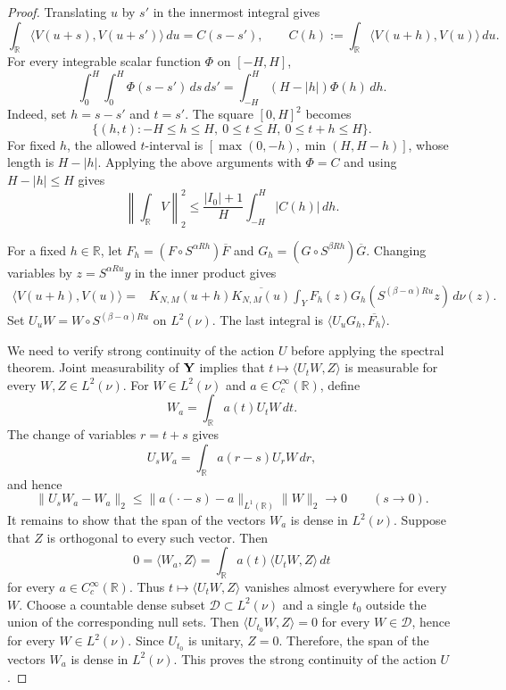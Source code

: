 \documentclass[reqno,12pt]{amsart}
\def \R {\mathbb R}
\numberwithin{equation}{section}
\begin{document}
\begin{proof}
Translating $u$ by $s'$ in the innermost integral gives
\[
 \int_\R\langle V(u+s),V(u+s')\rangle\,du=C(s-s'),
 \qquad
 C(h):=\int_\R\langle V(u+h),V(u)\rangle\,du.
\]
For every integrable scalar function $\Phi$ on $[-H,H]$,
\[
 \int_0^H\int_0^H\Phi(s-s')\,ds\,ds'
 =\int_{-H}^H(H-|h|)\Phi(h)\,dh.
\]
Indeed, set $h=s-s'$ and $t=s'$. The square $[0,H]^2$ becomes
\[
 \{(h,t):-H\le h\le H,\ 0\le t\le H,\ 0\le t+h\le H\}.
\]
For fixed $h$, the allowed $t$-interval is
$[\max(0,-h),\min(H,H-h)]$, whose length is $H-|h|$. Applying the above arguments with $\Phi=C$ and using $H-|h|\le H$ gives
\[
 \left\|\int_\R V\right\|_2^2
 \le\frac{|I_0|+1}{H}\int_{-H}^H|C(h)|\,dh.
\]

For a fixed $h\in\R$, let
$F_h=(F\circ S^{\alpha Rh})\overline F$ and
$G_h=(G\circ S^{\beta Rh})\overline G$.
Changing variables by $z=S^{\alpha Ru}y$ in the inner product gives
\begin{align*}
 \langle V(u+h),V(u)\rangle
 ={}&K_{N,M}(u+h)\overline{K_{N,M}(u)}
 \int_Y F_h(z)G_h(S^{(\beta-\alpha)Ru}z)\,d\nu(z).
\end{align*}
Set $U_uW=W\circ S^{(\beta-\alpha)Ru}$ on $L^2(\nu)$.
The last integral is $\langle U_uG_h,\overline{F_h}\rangle$.

We need to verify strong continuity of the action $U$ before applying the spectral theorem. Joint measurability of ${\bf Y}$ implies that
$t\mapsto\langle U_tW,Z\rangle$ is measurable for every $W,Z\in L^2(\nu)$. For
$W\in L^2(\nu)$ and $a\in C_c^\infty(\R)$, define 
\[
 W_a=\int_\R a(t)U_tW\,dt.
\]
The change of variables $r=t+s$ gives
\[
 U_sW_a=\int_\R a(r-s)U_rW\,dr,
\]
and hence
\[
 \|U_sW_a-W_a\|_2
 \le \|a(\cdot-s)-a\|_{L^{1}(\R)}\|W\|_2\longrightarrow0
 \qquad(s\to0).
\]
It remains to show that the span of the vectors $W_a$ is dense in $L^2(\nu)$. Suppose that
$Z$ is orthogonal to every such vector. Then
\[
 0=\langle W_a,Z\rangle
 =\int_\R a(t)\langle U_tW,Z\rangle\,dt
\]
for every $a\in C_c^\infty(\R)$. Thus
$t\mapsto\langle U_tW,Z\rangle$ vanishes almost everywhere for every $W$.
Choose a countable dense subset $\mathcal D\subset L^2(\nu)$ and a single
$t_0$ outside the union of the corresponding null sets. Then
$\langle U_{t_0}W,Z\rangle=0$ for every $W\in\mathcal D$, hence for every
$W\in L^2(\nu)$. Since $U_{t_0}$ is unitary, $Z=0$. Therefore, the span of the vectors $W_a$ is dense in $L^2(\nu)$. This proves the strong continuity of the action $U$.


\end{proof}
\end{document}
